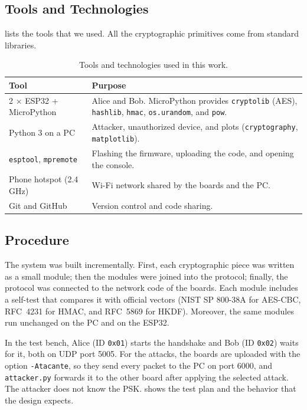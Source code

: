 \documentclass[11pt,a4paper]{article}
\begin{document}
\subsection{Tools and Technologies}

 lists the tools that we used. All the cryptographic primitives
come from standard libraries.

\begin{table}[H]
    \centering
    \caption{Tools and technologies used in this work.}
    \label{tab:tools}
    \small
    \begin{tabularx}{0.95\textwidth}{@{}lX@{}}
        \toprule
        \textbf{Tool} & \textbf{Purpose} \\
        \midrule
        2 $\times$ ESP32 + MicroPython & Alice and Bob. MicroPython provides \texttt{cryptolib} (AES), \texttt{hashlib}, \texttt{hmac}, \texttt{os.urandom}, and \texttt{pow}. \\
        Python 3 on a PC & Attacker, unauthorized device, and plots (\texttt{cryptography}, \texttt{matplotlib}). \\
        \texttt{esptool}, \texttt{mpremote} & Flashing the firmware, uploading the code, and opening the console. \\
        Phone hotspot (2.4 GHz) & Wi-Fi network shared by the boards and the PC. \\
        Git and GitHub & Version control and code sharing. \\
        \bottomrule
    \end{tabularx}
\end{table}

\subsection{Procedure}

The system was built incrementally. First, each cryptographic piece was written
as a small module; then the modules were joined into the protocol; finally, the
protocol was connected to the network code of the boards. Each module includes
a self-test that compares it with official vectors (NIST SP 800-38A for
AES-CBC, RFC~4231 for HMAC, and RFC~5869 for HKDF). Moreover, the same modules
run unchanged on the PC and on the ESP32.

In the test bench, Alice (ID \texttt{0x01}) starts the handshake and Bob (ID
\texttt{0x02}) waits for it, both on UDP port 5005. For the attacks, the boards
are uploaded with the option \texttt{-Atacante}, so they send every packet to
the PC on port 6000, and \texttt{attacker.py} forwards it to the other board
after applying the selected attack. The attacker does not know the PSK.
 shows the test plan and the behavior that the design
expects.
\end{document}
